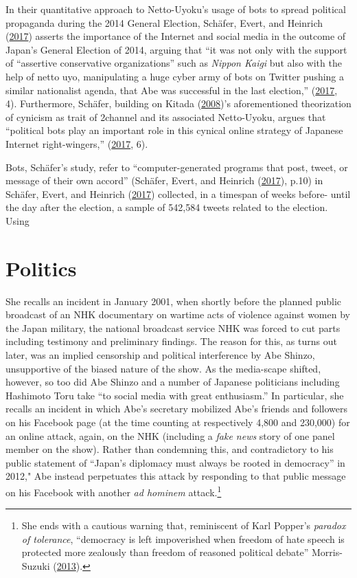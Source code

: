 \documentclass[10pt,british,A4paper,,openany]{memoir}
\begin{document}
In their quantitative approach to Netto-Uyoku's usage of bots to spread
political propaganda during the 2014 General Election, Schäfer, Evert,
and Heinrich (\protect\hyperlink{ref-schafer_japans_2017}{2017}) asserts
the importance of the Internet and social media in the outcome of
Japan's General Election of 2014, arguing that ``it was not only with
the support of ``assertive conservative organizations'' such as
\emph{Nippon Kaigi} but also with the help of netto uyo, manipulating a
huge cyber army of bots on Twitter pushing a similar nationalist agenda,
that Abe was successful in the last election,''
(\protect\hyperlink{ref-schafer_japans_2017}{2017}, 4). Furthermore,
Schäfer, building on Kitada
(\protect\hyperlink{ref-kitada__2008}{2008})'s aforementioned
theorization of cynicism as trait of 2channel and its associated
Netto-Uyoku, argues that ``political bots play an important role in this
cynical online strategy of Japanese Internet right-wingers,''
(\protect\hyperlink{ref-schafer_japans_2017}{2017}, 6).

Bots, Schäfer's study, refer to ``computer-generated programs that post,
tweet, or message of their own accord'' (Schäfer, Evert, and Heinrich
(\protect\hyperlink{ref-schafer_japans_2017}{2017}), p.10) in Schäfer,
Evert, and Heinrich (\protect\hyperlink{ref-schafer_japans_2017}{2017})
collected, in a timespan of weeks before- until the day after the
election, a sample of 542,584 tweets related to the election. Using

\section{Politics}\label{politics}

She recalls an incident in January 2001, when shortly before the planned
public broadcast of an NHK documentary on wartime acts of violence
against women by the Japan military, the national broadcast service NHK
was forced to cut parts including testimony and preliminary findings.
The reason for this, as turns out later, was an implied censorship and
political interference by Abe Shinzo, unsupportive of the biased nature
of the show. As the media-scape shifted, however, so too did Abe Shinzo
and a number of Japanese politicians including Hashimoto Toru take ``to
social media with great enthusiasm.'' In particular, she recalls an
incident in which Abe's secretary mobilized Abe's friends and followers
on his Facebook page (at the time counting at respectively 4,800 and
230,000) for an online attack, again, on the NHK (including a \emph{fake
news} story of one panel member on the show). Rather than condemning
this, and contradictory to his public statement of ``Japan's diplomacy
must always be rooted in democracy'' in 2012," Abe instead perpetuates
this attack by responding to that public message on his Facebook with
another \emph{ad hominem} attack.\footnote{She ends with a cautious
  warning that, reminiscent of Karl Popper's \emph{paradox of
  tolerance}, ``democracy is left impoverished when freedom of hate
  speech is protected more zealously than freedom of reasoned political
  debate'' Morris-Suzuki
  (\protect\hyperlink{ref-morris-suzuki_freedom_2013}{2013}).}
\end{document}
